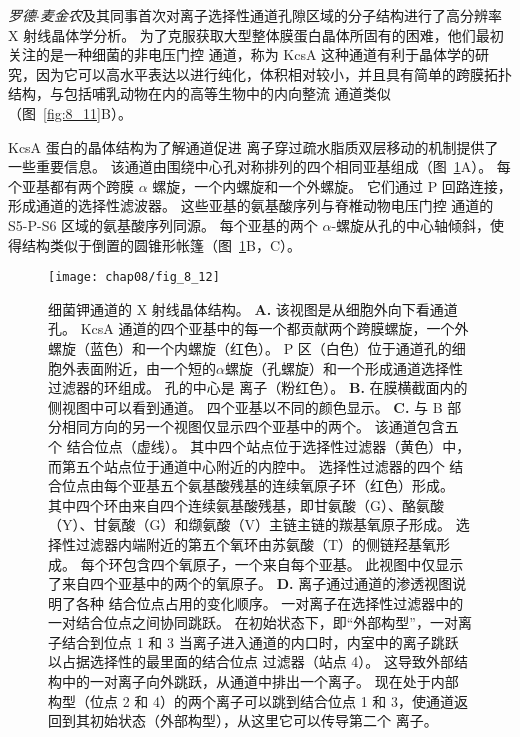 \textit{罗德$\cdot$麦金农}及其同事首次对离子选择性通道孔隙区域的分子结构进行了高分辨率 X 射线晶体学分析。
为了克服获取大型整体膜蛋白晶体所固有的困难，他们最初关注的是一种细菌的非电压门控  通道，称为 KcsA
这种通道有利于晶体学的研究，因为它可以高水平表达以进行纯化，体积相对较小，并且具有简单的跨膜拓扑结构，与包括哺乳动物在内的高等生物中的内向整流 通道类似（图~\ref{fig:8_11}B）。


KcsA 蛋白的晶体结构为了解通道促进  离子穿过疏水脂质双层移动的机制提供了一些重要信息。
该通道由围绕中心孔对称排列的四个相同亚基组成（图~\ref{fig:8_12}A）。
每个亚基都有两个跨膜 $\alpha$ 螺旋，一个内螺旋和一个外螺旋。
它们通过 P 回路连接，形成通道的选择性滤波器。
这些亚基的氨基酸序列与脊椎动物电压门控  通道的 S5-P-S6 区域的氨基酸序列同源。
每个亚基的两个 $\alpha$-螺旋从孔的中心轴倾斜，使得结构类似于倒置的圆锥形帐篷（图~\ref{fig:8_12}B，C）。


\begin{figure}[htbp]
	\centering
	\texttt{[image: chap08/fig\_8\_12]}
	\caption{细菌钾通道的 X 射线晶体结构\cite{doyle1998structure}。
		\textbf{A.} 该视图是从细胞外向下看通道孔。
		KcsA  通道的四个亚基中的每一个都贡献两个跨膜螺旋，一个外螺旋（蓝色）和一个内螺旋（红色）。
		P 区（白色）位于通道孔的细胞外表面附近，由一个短的$\alpha$螺旋（孔螺旋）和一个形成通道选择性过滤器的环组成。
		孔的中心是  离子（粉红色）。
		\textbf{B.} 在膜横截面内的侧视图中可以看到通道。 四个亚基以不同的颜色显示。
		\textbf{C.} 与 B 部分相同方向的另一个视图仅显示四个亚基中的两个。
		该通道包含五个  结合位点（虚线）。
		其中四个站点位于选择性过滤器（黄色）中，而第五个站点位于通道中心附近的内腔中。
		选择性过滤器的四个  结合位点由每个亚基五个氨基酸残基的连续氧原子环（红色）形成。
		其中四个环由来自四个连续氨基酸残基，即甘氨酸（G）、酪氨酸（Y）、甘氨酸（G）和缬氨酸（V）主链主链的羰基氧原子形成。
		选择性过滤器内端附近的第五个氧环由苏氨酸（T）的侧链羟基氧形成。
		每个环包含四个氧原子，一个来自每个亚基。
		此视图中仅显示了来自四个亚基中的两个的氧原子\cite{morais2001energetic}。
		\textbf{D.}  离子通过通道的渗透视图说明了各种  结合位点占用的变化顺序。
		一对离子在选择性过滤器中的一对结合位点之间协同跳跃。
		在初始状态下，即“外部构型”，一对离子结合到位点 1 和 3
		当离子进入通道的内口时，内室中的离子跳跃以占据选择性的最里面的结合位点 过滤器（站点 4）。
		这导致外部结构中的一对离子向外跳跃，从通道中排出一个离子。
		现在处于内部构型（位点 2 和 4）的两个离子可以跳到结合位点 1 和 3，使通道返回到其初始状态（外部构型），从这里它可以传导第二个  离子\cite{miller2001see}。}
	\label{fig:8_12}
\end{figure}


